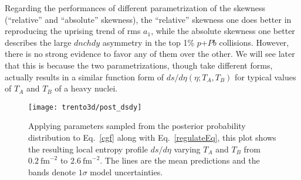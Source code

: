 Regarding the performances of different parametrization of the skewness (``relative'' and ``absolute'' skewness), the ``relative'' skewness one does better in reproducing the uprising trend of rms $a_1$, while the absolute skewness one better describes the large $dnchdy$ asymmetry in the top 1\% $p$+$Pb$ collisions.
However, there is no strong evidence to favor any of them over the other.
We will see later that this is because the two parametrizations, though take different forms, actually results in a similar function form of $ds/d\eta(\eta; T_A, T_B)$ for typical values of $T_A$ and $T_B$ of a heavy nuclei.

\begin{figure}
\centering
\texttt{[image: trento3d/post\_dsdy]}
\caption{Applying parameters sampled from the posterior probability distribution to Eq.~\eqref{cgf} along with Eq.~\eqref{regulateEq}, this plot shows the resulting local entropy profile $ds/d\eta$ varying $T_A$ and $T_B$ from $0.2~\text{fm}^{-2}$ to $2.6~\text{fm}^{-2}$. The lines are the mean predictions and the bands denote $1\sigma$ model uncertainties.
}
\label{fig:trento:post_dsdy}
\end{figure}


